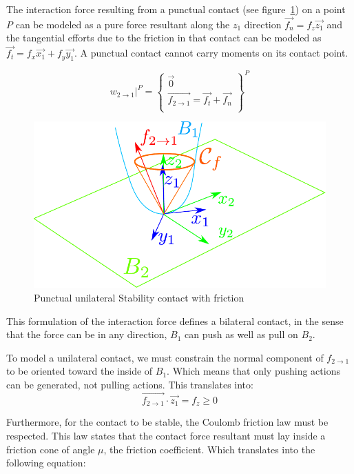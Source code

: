 The interaction force resulting from a punctual contact (see figure~\ref{fig:frictionCone}) on a point $P$ can be modeled as a pure force resultant along the $z_1$ direction $\vec{f_n} = f_z \vec{z_1}$ and the tangential efforts due to the friction in that contact can be modeled as $\vec{f_t} = f_x \vec{x_1} + f_y \vec{y_1}$. A punctual contact cannot carry moments on its contact point.

\begin{equation}
\label{eq:punctual_force}
\left. w_{2\rightarrow 1}\right|^P = \left\{
  \begin{array}{l}
    \vec{0} \\
    \overrightarrow{f_{2\rightarrow 1}} = \vec{f_t} + \vec{f_n} \\
  \end{array}
  \right\}^P
\end{equation}

\begin{figure}[htpb]
  \centering
  \includegraphics[width=0.6\linewidth]{frictionCone.pdf}
  \caption{Punctual unilateral Stability contact with friction}
\label{fig:frictionCone}
\end{figure}

This formulation of the interaction force defines a bilateral contact, in the sense that the force can be in any direction, $B_1$ can push as well as pull on $B_2$.

To model a unilateral contact, we must constrain the normal component of $f_{2\rightarrow 1}$ to be oriented toward the inside of $B_1$. Which means that only pushing actions can be generated, not pulling actions.
This translates into:
\begin{equation}
  \overrightarrow{f_{2\rightarrow 1}}\cdot \vec{z_1} = f_z \geq 0
\end{equation}

Furthermore, for the contact to be stable, the Coulomb friction law must be respected.
This law states that the contact force resultant must lay inside a friction cone of angle $\mu$, the friction coefficient.
Which translates into the following equation:

